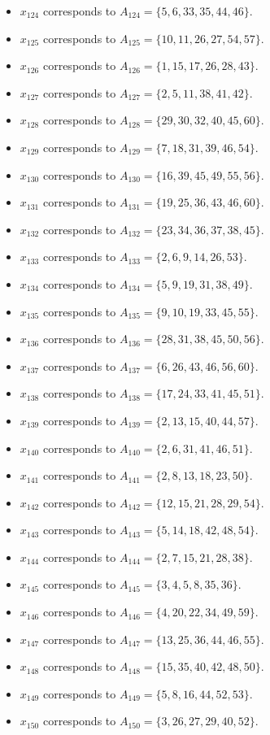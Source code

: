 \documentclass[11pt]{article}
\begin{document}
\begin{itemize}
\item $x_{124}$ corresponds to $A_{124}=\{5, 6, 33, 35, 44, 46\}$.
\item $x_{125}$ corresponds to $A_{125}=\{10, 11, 26, 27, 54, 57\}$.
\item $x_{126}$ corresponds to $A_{126}=\{1, 15, 17, 26, 28, 43\}$.
\item $x_{127}$ corresponds to $A_{127}=\{2, 5, 11, 38, 41, 42\}$.
\item $x_{128}$ corresponds to $A_{128}=\{29, 30, 32, 40, 45, 60\}$.
\item $x_{129}$ corresponds to $A_{129}=\{7, 18, 31, 39, 46, 54\}$.
\item $x_{130}$ corresponds to $A_{130}=\{16, 39, 45, 49, 55, 56\}$.
\item $x_{131}$ corresponds to $A_{131}=\{19, 25, 36, 43, 46, 60\}$.
\item $x_{132}$ corresponds to $A_{132}=\{23, 34, 36, 37, 38, 45\}$.
\item $x_{133}$ corresponds to $A_{133}=\{2, 6, 9, 14, 26, 53\}$.
\item $x_{134}$ corresponds to $A_{134}=\{5, 9, 19, 31, 38, 49\}$.
\item $x_{135}$ corresponds to $A_{135}=\{9, 10, 19, 33, 45, 55\}$.
\item $x_{136}$ corresponds to $A_{136}=\{28, 31, 38, 45, 50, 56\}$.
\item $x_{137}$ corresponds to $A_{137}=\{6, 26, 43, 46, 56, 60\}$.
\item $x_{138}$ corresponds to $A_{138}=\{17, 24, 33, 41, 45, 51\}$.
\item $x_{139}$ corresponds to $A_{139}=\{2, 13, 15, 40, 44, 57\}$.
\item $x_{140}$ corresponds to $A_{140}=\{2, 6, 31, 41, 46, 51\}$.
\item $x_{141}$ corresponds to $A_{141}=\{2, 8, 13, 18, 23, 50\}$.
\item $x_{142}$ corresponds to $A_{142}=\{12, 15, 21, 28, 29, 54\}$.
\item $x_{143}$ corresponds to $A_{143}=\{5, 14, 18, 42, 48, 54\}$.
\item $x_{144}$ corresponds to $A_{144}=\{2, 7, 15, 21, 28, 38\}$.
\item $x_{145}$ corresponds to $A_{145}=\{3, 4, 5, 8, 35, 36\}$.
\item $x_{146}$ corresponds to $A_{146}=\{4, 20, 22, 34, 49, 59\}$.
\item $x_{147}$ corresponds to $A_{147}=\{13, 25, 36, 44, 46, 55\}$.
\item $x_{148}$ corresponds to $A_{148}=\{15, 35, 40, 42, 48, 50\}$.
\item $x_{149}$ corresponds to $A_{149}=\{5, 8, 16, 44, 52, 53\}$.
\item $x_{150}$ corresponds to $A_{150}=\{3, 26, 27, 29, 40, 52\}$.
\end{itemize}
\end{document}
